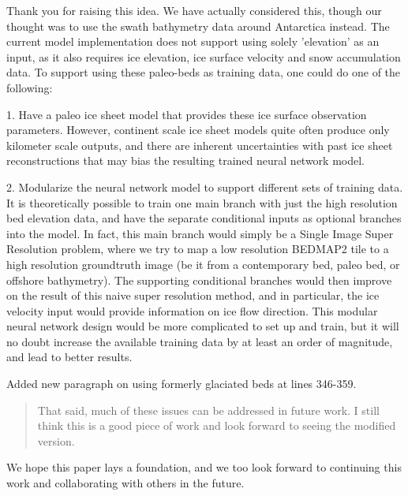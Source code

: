 \documentclass{article}
\begin{document}
Thank you for raising this idea.
We have actually considered this, though our thought was to use the swath bathymetry data around Antarctica instead.
The current model implementation does not support using solely 'elevation' as an input, as it also requires ice elevation, ice surface velocity and snow accumulation data.
To support using these paleo-beds as training data, one could do one of the following:

1. Have a paleo ice sheet model that provides these ice surface observation parameters.
However, continent scale ice sheet models quite often produce only kilometer scale outputs, and there are inherent uncertainties with past ice sheet reconstructions that may bias the resulting trained neural network model.

2. Modularize the neural network model to support different sets of training data.
It is theoretically possible to train one main branch with just the high resolution bed elevation data, and have the separate conditional inputs as optional branches into the model.
In fact, this main branch would simply be a Single Image Super Resolution problem, where we try to map a low resolution BEDMAP2 tile to a high resolution groundtruth image (be it from a contemporary bed, paleo bed, or offshore bathymetry).
The supporting conditional branches would then improve on the result of this naive super resolution method, and in particular, the ice velocity input would provide information on ice flow direction.
This modular neural network design would be more complicated to set up and train, but it will no doubt increase the available training data by at least an order of magnitude, and lead to better results.

{
  \color{ForestGreen}
  Added new paragraph on using formerly glaciated beds at lines 346-359.
}

\begin{quote}
\color{blue}
  That said, much of these issues can be addressed in future work.
  I still think this is a good piece of work and look forward to seeing the modified version.
\end{quote}

We hope this paper lays a foundation, and we too look forward to continuing this work and collaborating with others in the future.

\printbibliography
\end{document}
